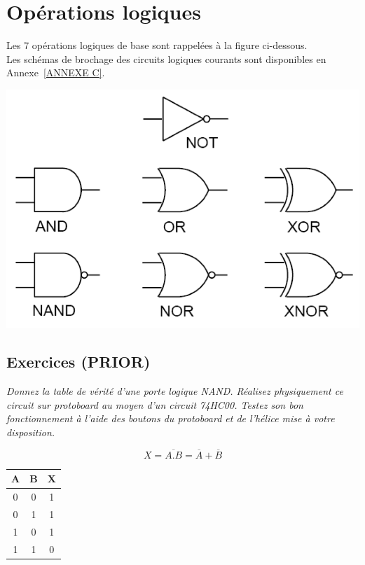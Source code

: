 \section{Opérations logiques}
Les 7 opérations logiques de base sont rappelées à la figure ci-dessous.\\
Les schémas de brochage des circuits logiques courants sont disponibles en Annexe~\ref{ANNEXE C}.
\begin{center}
\includegraphics[scale=0.4]{Labo3_Porteslogiques.png}
\end{center}


\subsection{Exercices (PRIOR)}
{
\textit{Donnez la table de vérité d’une porte logique NAND. Réalisez physiquement ce circuit sur protoboard au moyen d’un circuit 74HC00. Testez son bon fonctionnement à l’aide des boutons du
protoboard et de l’hélice mise à votre disposition.}\\
}
{%
$$X=\overline{A.B}=\overline{A}+\overline{B}$$
\begin{center}
		\begin{tabular}{|c|c|c|}
			\hline
            A&B&X\\
            \hline
            \hline
			0&0&1\\
			0&1&1\\
			1&0&1\\
			1&1&0\\
			\hline
		\end{tabular}
	\end{center}
}

